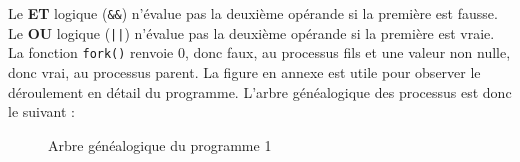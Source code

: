 \documentclass[
	12pt, %
]{fphw}
\begin{document}
Le \textbf{ET} logique (\texttt{\&\&}) n'évalue pas la deuxième opérande si la première est fausse.
Le \textbf{OU} logique (\texttt{||}) n'évalue pas la deuxième opérande si la première est vraie.
La fonction \texttt{fork()} renvoie 0, donc faux, au processus fils et une valeur non nulle, donc vrai, au processus parent. 
La figure en annexe est utile pour observer le déroulement en détail du programme.
L'arbre généalogique des processus est donc le suivant :
\begin{figure}
\begin{center}
\end{center}
\caption{Arbre généalogique du programme 1}
\end{figure}
\newpage
\end{document}
